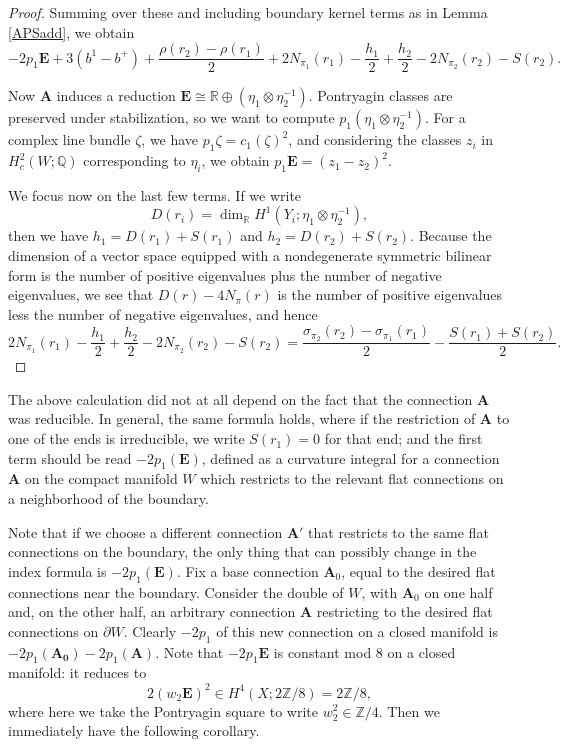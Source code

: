 \documentclass[10pt,a4paper]{amsart}
\theoremstyle{definition}
\theoremstyle{remark}
\numberwithin{figure}{qchap}
\begin{document}
\begin{proof}
Summing over these and including boundary kernel terms as in Lemma \ref{APSadd}, we obtain $$-2p_1 \mathbf{E} + 3(b^1 - b^+) + \frac{\rho(r_2) - \rho(r_1)}{2} + 2N_{\pi_1}(r_1) - \frac{h_1}{2} + \frac{h_2}{2} - 2N_{\pi_2}(r_2) - S(r_2).$$ 

Now $\mathbf{A}$ induces a reduction $\mathbf{E} \cong \mathbb R \oplus (\eta_1 \otimes \eta_2^{-1})$. Pontryagin classes are preserved under stabilization, so we want to compute $p_1(\eta_1 \otimes \eta_2^{-1})$. For a complex line bundle $\zeta$, we have $p_1 \zeta = c_1(\zeta)^2$, and considering the classes $z_i$ in $H^2_c(W;\mathbb Q)$ corresponding to $\eta_i$, we obtain $p_1 \mathbf{E} = (z_1 - z_2)^2$. 

We focus now on the last few terms. If we write 
$$D(r_i) = \dim_{\mathbb R} H^1(Y_i;\eta_1 \otimes \eta_2^{-1}),$$ 
then we have $h_1 = D(r_1) + S(r_1)$ and $h_2 = D(r_2) + S(r_2)$. Because the dimension of a vector space equipped with a nondegenerate symmetric bilinear form is the number of positive eigenvalues plus the number of negative eigenvalues, we see that $D(r)-4N_{\pi}(r)$ is the number of positive eigenvalues less the number of negative eigenvalues, and hence $$2N_{\pi_1}(r_1) - \frac{h_1}{2} + \frac{h_2}{2} - 2N_{\pi_2}(r_2) - S(r_2) = \frac{\sigma_{\pi_2}(r_2) - \sigma_{\pi_1}(r_1)}{2} - \frac{S(r_1) + S(r_2)}{2}.$$ 
\end{proof}

The above calculation did not at all depend on the fact that the connection $\mathbf{A}$ was reducible. In general, the same formula holds, where if the restriction of $\mathbf{A}$ to one of the ends is irreducible, we write $S(r_1) = 0$ for that end; and the first term should be read $-2 p_1(\mathbf{E})$, defined as a curvature integral for a connection $\mathbf{A}$ on the compact manifold $W$ which restricts to the relevant flat connections on a neighborhood of the boundary. 

Note that if we choose a different connection $\mathbf{A}'$ that restricts to the same flat connections on the boundary, the only thing that can possibly change in the index formula is $-2 p_1(\mathbf{E})$. Fix a base connection $\mathbf{A}_0$, equal to the desired flat connections near the boundary. Consider the double of $W$, with $\mathbf{A}_0$ on one half and, on the other half, an arbitrary connection $\mathbf{A}$ restricting to the desired flat connections on $\partial W$. Clearly $-2p_1$ of this new connection on a closed manifold is $-2p_1(\mathbf{A_0}) -2p_1(\mathbf{A})$. Note that $-2 p_1 \mathbf{E}$ is constant mod $8$ on a closed manifold: it reduces to 
$$2(w_2 \mathbf{E})^2 \in H^4(X;2\mathbb Z/8) = 2\mathbb Z/8,$$
where here we take the Pontryagin square to write $w_2^2 \in \mathbb Z/4$. Then we immediately have the following corollary.
\end{document}
